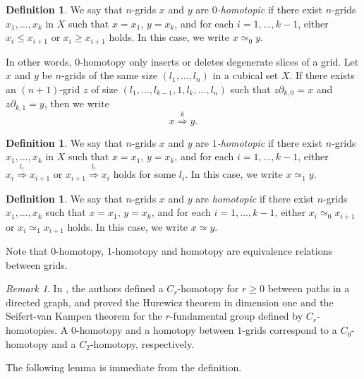 \documentclass[oneside, 12pt]{amsart}
\numberwithin{equation}{section}
\theoremstyle{plain}
\theoremstyle{definition}
\newtheorem{definition}[theorem]{Definition}
\theoremstyle{remark}
\newtheorem{remark}[theorem]{Remark}
\begin{document}
	
	
	\begin{definition}
		\label{0homotopy}
		We say that $n$-grids $x$ and $y$ are \emph{$0$-homotopic} if there exist $n$-grids $x_1,\ldots,x_k$ in $X$ such that $x=x_1$, $y=x_k$, and for each $i=1,\ldots,k-1$, either $x_i\le x_{i+1}$ or $x_i\ge x_{i+1}$ holds. In this case, we write $x\simeq_0y$.
	\end{definition}
	
	
	
	In other words, 0-homotopy only inserts or deletes degenerate slices of a grid. Let $x$ and $y$ be $n$-grids of the same size $(l_1,\ldots,l_n)$ in a cubical set $X$. If there exists an $(n+1)$-grid $z$ of size $(l_1,\ldots,l_{k-1},1,l_k,\ldots,l_n)$ such that $z\partial_{k,0}=x$ and $z\partial_{k,1}=y$, then we write
	\[
	x\overset{k}{\Rightarrow}y.
	\]
	
	
	
	\begin{definition}
		\label{1homotopy}
		We say that $n$-grids $x$ and $y$ are \emph{$1$-homotopic} if there exist $n$-grids $x_1,\ldots,x_k$ in $X$ such that $x=x_1$, $y=x_k$, and for each $i=1,\ldots,k-1$, either $x_i\overset{l_i}{\Rightarrow}x_{i+1}$ or $x_{i+1}\overset{l_i}{\Rightarrow}x_i$ holds for some $l_i$. In this case, we write $x\simeq_1y$.
	\end{definition}
	
	
	
	\begin{definition}
		\label{homotopy grids def}
		We say that $n$-grids $x$ and $y$ are \emph{homotopic} if there exist $n$-grids $x_1,\ldots,x_k$ such that $x=x_1$, $y=x_k$, and for each $i=1,\ldots,k-1$, either $x_i\simeq_0x_{i+1}$ or $x_i\simeq_1x_{i+1}$ holds. In this case, we write $x\simeq y$.
	\end{definition}
	Note that 0-homotopy, 1-homotopy and homotopy are equivalence relations between grids.
	
	
	\begin{remark}
		In \cite{KT}, the authors defined a $C_r$-homotopy for $r\ge 0$ between paths in a directed graph, and proved the Hurewicz theorem in dimension one and the Seifert-van Kampen theorem for the $r$-fundamental group defined by $C_r$-homotopies. A $0$-homotopy and a homotopy between $1$-grids correspond to a $C_0$-homotopy and a $C_2$-homotopy, respectively.
	\end{remark}
	
	
	
	The following lemma is immediate from the definition.
	
\end{document}
